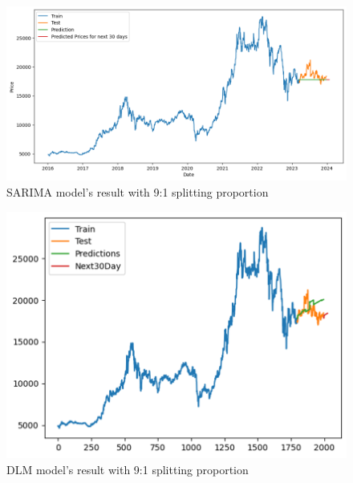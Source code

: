 \documentclass{ieeeojies}
\begin{document}
\begin{figure}[H]
  \centering
  \begin{minipage}{0.8\linewidth}
    \centering
    \includegraphics[width=\linewidth]{bibliography/SARIMA_MBB91.png}
    \caption{SARIMA model's result with 9:1 splitting proportion}
    \label{fig19}
  \end{minipage}
\end{figure}
\begin{figure}[H]
  \centering
  \begin{minipage}{0.8\linewidth}
    \centering
    \includegraphics[width=\linewidth]{bibliography/DLM_MBB91.png}
    \caption{DLM model's result with 9:1 splitting proportion}
    \label{fig20}
  \end{minipage}
\end{figure}
\end{document}
